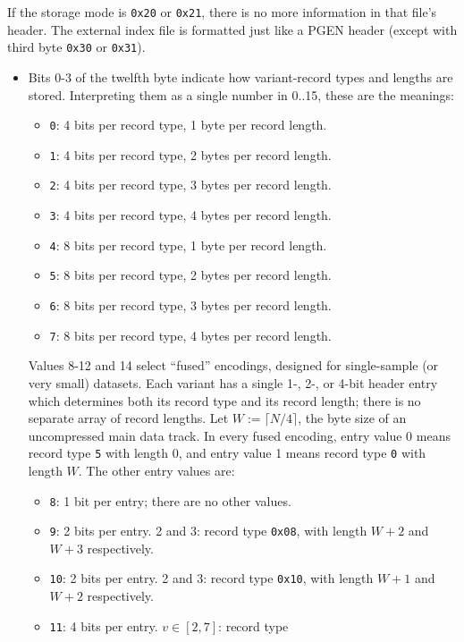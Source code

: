 \documentclass[8pt]{article}
\begin{document}
If the storage mode is \texttt{0x20} or \texttt{0x21}, there is no more
information in that file's header.  The external index file is formatted just
like a PGEN header (except with third byte \texttt{0x30} or \texttt{0x31}).

\begin{itemize}
  \itemsep0em
\item Bits 0-3 of the twelfth byte indicate how variant-record types and
  lengths are stored.  Interpreting them as a single number in 0..15, these are
  the meanings:
  \begin{itemize}
  \item \texttt{0}: 4 bits per record type, 1 byte per record length.
  \item \texttt{1}: 4 bits per record type, 2 bytes per record length.
  \item \texttt{2}: 4 bits per record type, 3 bytes per record length.
  \item \texttt{3}: 4 bits per record type, 4 bytes per record length.
  \item \texttt{4}: 8 bits per record type, 1 byte per record length.
  \item \texttt{5}: 8 bits per record type, 2 bytes per record length.
  \item \texttt{6}: 8 bits per record type, 3 bytes per record length.
  \item \texttt{7}: 8 bits per record type, 4 bytes per record length.
  \end{itemize}
  Values 8-12 and 14 select ``fused'' encodings, designed for single-sample
  (or very small) datasets.  Each variant has a single 1-, 2-, or 4-bit
  header entry which determines both its record type and its record length;
  there is no separate array of record lengths.  Let $W:=\lceil N/4\rceil $,
  the byte size of an uncompressed main data track.  In every fused encoding,
  entry value 0 means record type \texttt{5} with length 0, and entry value 1
  means record type \texttt{0} with length $W$.  The other entry values are:
  \begin{itemize}
  \item \texttt{8}: 1 bit per entry; there are no other values.
  \item \texttt{9}: 2 bits per entry.  2 and 3: record type \texttt{0x08},
    with length $W+2$ and $W+3$ respectively.
  \item \texttt{10}: 2 bits per entry.  2 and 3: record type \texttt{0x10},
    with length $W+1$ and $W+2$ respectively.
  \item \texttt{11}: 4 bits per entry.  $v\in [2, 7]$: record type

\end{itemize}
\end{itemize}
\end{document}

